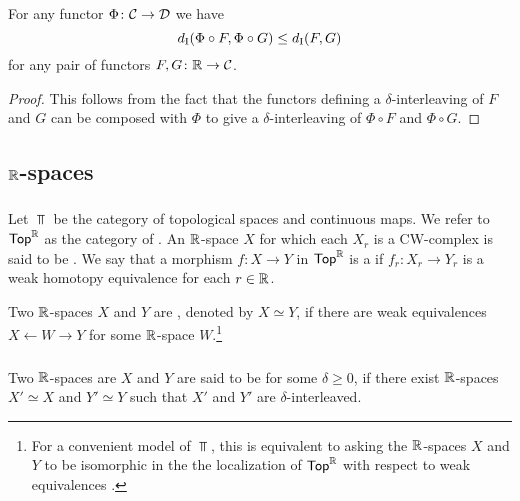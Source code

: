 \medskip\lemma For any functor $\Phi \colon \mathcal{C} \to \mathcal{D}$ we have
\[
d_{\mathrm{I}}(\Phi \circ F, \Phi \circ G) \leq d_{\mathrm{I}}(F, G)
\]
for any pair of functors $F, G \colon \mathbb{R} \to \mathcal{C}$.

\begin{proof}
	This follows from the fact that the functors defining a $\delta$-interleaving of $F$ and $G$ can be composed with $\Phi$ to give a $\delta$-interleaving of $\Phi \circ F$ and $\Phi \circ G$.
\end{proof}


\subsection{$\mathbb{R}$-spaces}

\subsubsection{}

Let $\Top$ be the category of topological spaces and continuous maps.
We refer to $\mathsf{Top}^{\mathbb{R}}$ as the category of .
An $\mathbb{R}$-space $X$ for which each $X_r$ is a CW-complex is said to be .
We say that a morphism $f \colon X \to Y$ in $\mathsf{Top}^{\mathbb{R}}$ is a  if $f_r \colon X_r \to Y_r$ is a weak homotopy equivalence for each $r \in \mathbb{R}$.

Two $\mathbb{R}$-spaces $X$ and $Y$ are , denoted by $X \simeq Y$, if there are weak equivalences $X \leftarrow W \rightarrow Y$ for some $\mathbb{R}$-space $W$.\footnote{
For a convenient model of $\Top$, this is equivalent to asking the $\mathbb{R}$-spaces $X$ and $Y$ to be isomorphic in the the localization of $\mathsf{Top}^{\mathbb{R}}$ with respect to weak equivalences \cite{blumberg2023interleaving}.}

\subsubsection{}\label{def:dhi}

Two $\mathbb{R}$-spaces are $X$ and $Y$ are said to be  for some $\delta \geq 0$, if there exist $\mathbb{R}$-spaces $X' \simeq X$ and $Y' \simeq Y$ such that $X'$ and $Y'$ are $\delta$-interleaved.

